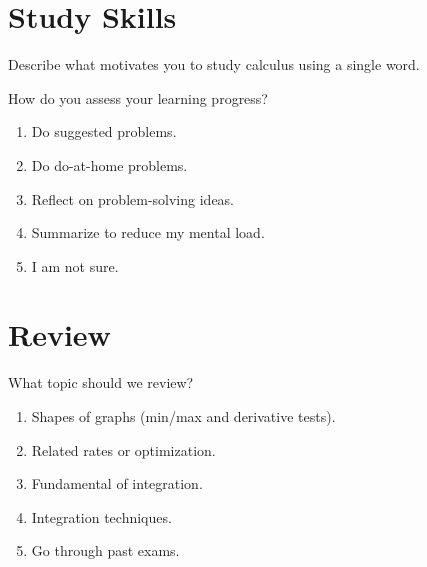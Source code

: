 \documentclass[14pt]{beamer}
\begin{document}
\section{Study Skills}
\begin{frame}
  Describe what motivates you to study calculus using a single word.
\end{frame}

\begin{frame}
  How do you assess your learning progress?

  \medskip
  \begin{enumerate} 
    \item Do suggested problems.
    \item Do do-at-home problems.
    \item Reflect on problem-solving ideas.
    \item Summarize to reduce my mental load.
    \item I am not sure.
  \end{enumerate} 
\end{frame}


\section{Review}
\begin{frame}
  What topic should we review?

  \medskip
  \begin{enumerate} 
    \item Shapes of graphs (min/max and derivative tests).
    \item Related rates or optimization.
    \item Fundamental of integration.
    \item Integration techniques.
    \item Go through past exams.
  \end{enumerate} 
\end{frame}
\end{document}
